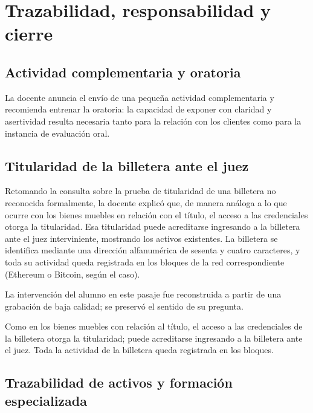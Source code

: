 \documentclass[12pt,oneside]{book}
\begin{document}
\chapter{Trazabilidad, responsabilidad y cierre}

\section{Actividad complementaria y oratoria}

\begin{note}
La docente anuncia el envío de una pequeña actividad complementaria y recomienda entrenar la oratoria: la capacidad de exponer con claridad y asertividad resulta necesaria tanto para la relación con los clientes como para la instancia de evaluación oral.
\end{note}

\section{Titularidad de la billetera ante el juez}

Retomando la consulta sobre la prueba de titularidad de una billetera no reconocida formalmente, la docente explicó que, de manera análoga a lo que ocurre con los bienes muebles en relación con el título, el acceso a las credenciales otorga la titularidad. Esa titularidad puede acreditarse ingresando a la billetera ante el juez interviniente, mostrando los activos existentes. La billetera se identifica mediante una dirección alfanumérica de sesenta y cuatro caracteres, y toda su actividad queda registrada en los bloques de la red correspondiente (Ethereum o Bitcoin, según el caso).

\begin{note}
La intervención del alumno en este pasaje fue reconstruida a partir de una grabación de baja calidad; se preservó el sentido de su pregunta.
\end{note}

\begin{important}
Como en los bienes muebles con relación al título, el acceso a las credenciales de la billetera otorga la titularidad; puede acreditarse ingresando a la billetera ante el juez. Toda la actividad de la billetera queda registrada en los bloques.
\end{important}

\section{Trazabilidad de activos y formación especializada}
\end{document}

